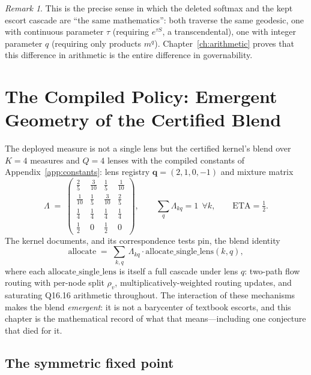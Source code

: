 \documentclass[12pt,oneside]{report}
\theoremstyle{plain}
\theoremstyle{definition}
\theoremstyle{remark}
\newtheorem{remarkx}[theorem]{Remark}
\begin{document}
\begin{remarkx}
This is the precise sense in which the deleted softmax and the kept
escort cascade are ``the same mathematics'': both traverse the same
geodesic, one with continuous parameter $\tau$ (requiring $e^{\tau S}$,
a transcendental), one with integer parameter $q$ (requiring only
products $m^q$). Chapter~\ref{ch:arithmetic} proves that this
difference in arithmetic is the entire difference in governability.
\end{remarkx}

\chapter{The Compiled Policy: Emergent Geometry of the Certified Blend}
\label{ch:blend}

The deployed measure is not a single lens but the certified kernel's
blend over $K=4$ measures and $Q=4$ lenses with the compiled constants
of Appendix~\ref{app:constants}: lens registry
$\mathbf{q}=(2,1,0,-1)$ and mixture matrix
\begin{equation}
\Lambda \;=\;
\begin{pmatrix}
\tfrac25 & \tfrac3{10} & \tfrac15 & \tfrac1{10}\\[2pt]
\tfrac1{10} & \tfrac15 & \tfrac3{10} & \tfrac25\\[2pt]
\tfrac14 & \tfrac14 & \tfrac14 & \tfrac14\\[2pt]
\tfrac12 & 0 & \tfrac12 & 0
\end{pmatrix},
\qquad \sum_{q}\Lambda_{kq}=1\ \ \forall k,
\qquad \mathrm{ETA}=\tfrac12 .
\label{eq:lambda}
\end{equation}
The kernel documents, and its correspondence tests pin, the blend
identity
\begin{equation}
\mathrm{allocate} \;=\; \sum_{k,q}\,\Lambda_{kq}\cdot
\mathrm{allocate\_single\_lens}(k,q),
\label{eq:blend-identity}
\end{equation}
where each $\mathrm{allocate\_single\_lens}$ is itself a full cascade
under lens $q$: two-path flow routing with per-node split $\rho_v$,
multiplicatively-weighted routing updates, and saturating Q16.16
arithmetic throughout. The interaction of these mechanisms makes the
blend \emph{emergent}: it is not a barycenter of textbook escorts, and
this chapter is the mathematical record of what that means---including
one conjecture that died for it.

\section{The symmetric fixed point}
\end{document}
